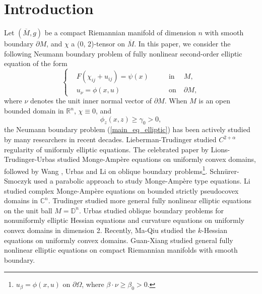 \documentclass[12pt]{amsart}
\theoremstyle{definition}
\theoremstyle{remark}
\numberwithin{equation}{section}
\begin{document}
\section{Introduction}
Let $(\overline{M}, g)$ be a compact Riemannian manifold of dimension $n$ with smooth boundary $\partial M$, and $\chi$ a (0, 2)-tensor on $\overline{M}$. 
In this paper, we consider the following Neumann boundary problem of fully nonlinear second-order elliptic equation of the form
\begin{equation} \label{main_eq_elliptic}
\left\{
\begin{aligned}
&F(\chi_{ij} + u_{ij}) = \psi(x) \qquad &\text{in}\; & M, \\ 
&u_\nu = \phi(x, u) \qquad &\text{on} \; & \partial M, 
\end{aligned}
\right.
\end{equation}
where $\nu$ denotes the unit inner normal vector of $\partial M$.
When $M$ is an open bounded domain in $\mathbb{R}^n$, $\chi \equiv 0$, and 
\begin{equation}\label{phi_z_strictly_+}
\phi_z (x, z) \geq \gamma_0 > 0,
\end{equation}
the Neumann boundary problem (\ref{main_eq_elliptic}) has been actively studied by many researchers in recent decades.
Lieberman-Trudinger \cite{LiebTru86} studied $C^{2 + \alpha}$ regularity of uniformly elliptic equations. 
The celebrated paper \cite{LionsTrudUrbas86} by Lions-Trudinger-Urbas studied Monge-Amp\`ere equations on uniformly convex domains, followed by Wang \cite{Wang92}, Urbas \cite{Urbas98} and Li \cite{S.Li99} on oblique boundary problems\footnote{$u_\beta = \phi(x, u)$ on $\partial \Omega$, where $\beta\cdot\nu \geq \beta_0 >0.$}. 
Schnürer-Smoczyk \cite{SchnurerSmoczyk03} used a parabolic approach to study Monge-Amp\`ere type equations.
Li \cite{S.Li94} studied complex Monge-Amp\`ere equations on bounded strictly pseudocovex domains in $\mathbb{C}^n$. 
Trudinger \cite{Tru87} studied more general fully nonlinear elliptic equations on the unit ball $M = \mathbb{D}^{n}$. 
Urbas \cite{Urbas95} \cite{Urbas96} studied oblique boundary problems for nonuniformly elliptic Hessian equations and curvature equations on uniformly convex domains in dimension 2.
Recently, Ma-Qiu \cite{MaQiu19} studied the $k$-Hessian equations on uniformly convex domains. Guan-Xiang \cite{GuanXiang18} studied general fully nonlinear elliptic equations on compact Riemannian manifolds with smooth boundary. 
\end{document}
